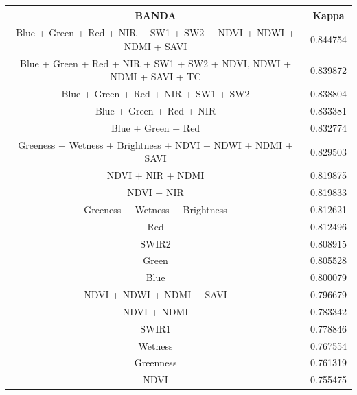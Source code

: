 \documentclass[12pt,a4paper]{article}
\begin{document}
\begin{table}[h!]
\centering
{}
\footnotesize
\begin{tabular}{|c | c|}
\hline
                                                               BANDA &  Kappa \\
\hline
    Blue + Green + Red + NIR + SW1 + SW2 + NDVI + NDWI + NDMI + SAVI &  0.844754 \\
Blue + Green + Red + NIR + SW1 + SW2 + NDVI, NDWI + NDMI + SAVI + TC &  0.839872 \\
                                Blue + Green + Red + NIR + SW1 + SW2 &  0.838804 \\
                                            Blue + Green + Red + NIR &  0.833381 \\
                                                  Blue + Green + Red &  0.832774 \\
         Greeness + Wetness + Brightness + NDVI + NDWI + NDMI + SAVI &  0.829503 \\
                                                   NDVI + NIR + NDMI &  0.819875 \\
                                                          NDVI + NIR &  0.819833 \\
                                     Greeness + Wetness + Brightness &  0.812621 \\
                                                                 Red &  0.812496 \\
                                                               SWIR2 &  0.808915 \\
                                                              Green  &  0.805528 \\
                                                                Blue &  0.800079 \\
                                           NDVI + NDWI + NDMI + SAVI &  0.796679 \\
                                                         NDVI + NDMI &  0.783342 \\
                                                               SWIR1 &  0.778846 \\
                                                             Wetness &  0.767554 \\
                                                           Greenness &  0.761319 \\
                                                               NDVI  &  0.755475 \\

\end{tabular}
\end{table}
\end{document}
